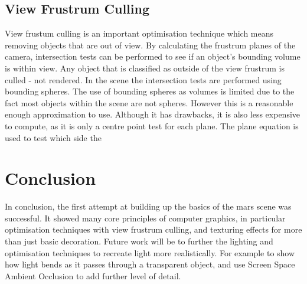 \documentclass[conference]{acmsiggraph}
\begin{document}
\subsection{View Frustrum Culling}
View frustum culling is an important optimisation technique which means removing objects that are out of view. By calculating the frustrum planes of the camera, intersection tests can be performed to see if an object's bounding volume is within view. Any object that is classified as outside of the view frustrum is culled - not rendered. In the scene the intersection tests are performed using bounding spheres. The use of bounding spheres as volumes is limited due to the fact most objects within the scene are not spheres. However this is a reasonable enough approximation to use. Although it has drawbacks, it is also less expensive to compute, as it is only a centre point test for each plane. The plane equation is used to test which side the 


\section{Conclusion}
In conclusion, the first attempt at building up the basics of the mars scene was successful. It showed many core principles of computer graphics, in particular optimisation techniques with view frustrum culling, and texturing effects for more than just basic decoration. Future work will be to further the lighting and optimisation techniques to recreate light more realistically. For example to show how light bends as it passes through a transparent object, and use Screen Space Ambient Occlusion to add further level of detail.


\end{document}
